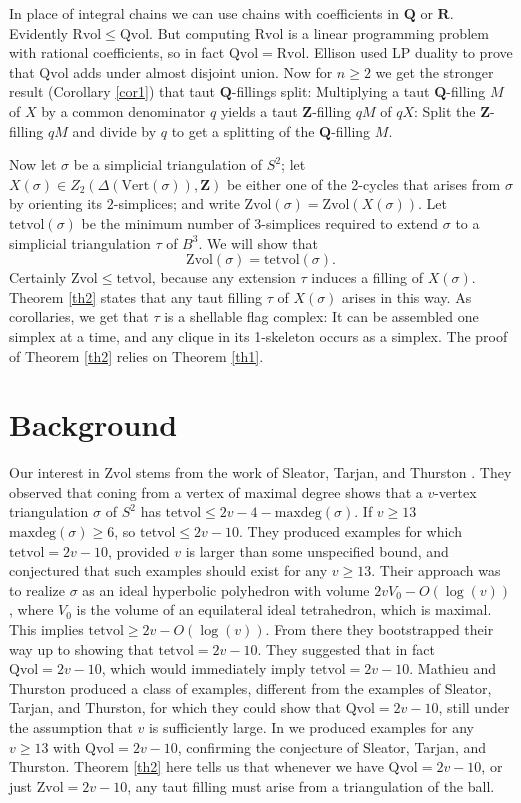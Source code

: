 \documentclass[12pt]{article}
\def\ZZ{\mathbf{Z}}
\def\QQ{\mathbf{Q}}
\def\RR{\mathbf{R}}
\newcommand{\kw}{\mathrm}
\newcommand{\maxdeg}{\kw{maxdeg}}
\newcommand{\vertices}{\kw{Vert}}
\newcommand{\Zvol}{\kw{Zvol}}
\newcommand{\Qvol}{\kw{Qvol}}
\newcommand{\Rvol}{\kw{Rvol}}
\newcommand{\tetvol}{\kw{tetvol}}
\begin{document}
In place of integral chains we can use chains with
coefficients in $\QQ$ or $\RR$.
Evidently $\Rvol \leq \Qvol$.
But computing $\Rvol$ is
a linear programming problem with rational coefficients,
so in fact $\Qvol = \Rvol$.
Ellison used LP duality to prove that
$\Qvol$ adds under almost
disjoint union.
Now for $n \geq 2$ we get the stronger result
(Corollary \ref{cor1})
that taut $\QQ$-fillings split:
Multiplying a taut
$\QQ$-filling $M$ of $X$ by a common denominator $q$
yields a taut $\ZZ$-filling $qM$ of $qX$:
Split the $\ZZ$-filling $qM$ and divide by $q$ to get a splitting
of the $\QQ$-filling $M$.

Now let $\sigma$ be a simplicial triangulation of $S^2$;
let $X(\sigma) \in Z_2(\Delta(\vertices(\sigma)),\ZZ)$
be either one of the 2-cycles
that arises from $\sigma$ by orienting its $2$-simplices;
and write $\Zvol(\sigma) = \Zvol(X(\sigma))$.
Let $\tetvol(\sigma)$ be the minimum number of $3$-simplices
required to extend $\sigma$ to a simplicial triangulation $\tau$ of $B^3$.
We will show that
\[
\Zvol(\sigma) = \tetvol(\sigma)
.
\]
Certainly $\Zvol \leq \tetvol$,
because any extension $\tau$ induces a filling
of $X(\sigma)$.
Theorem \ref{th2} states that 
any taut filling $\tau$ of $X(\sigma)$ arises in this way.
As corollaries,
we get that $\tau$ is a shellable flag complex:
It can be assembled one simplex at a time,
and any clique in its 1-skeleton occurs as a simplex.
The proof of Theorem \ref{th2} relies on Theorem \ref{th1}.

\section{Background}

Our interest in $\Zvol$ stems from the work
of Sleator, Tarjan, and Thurston
\cite{stt:jams}.
They observed that coning from a vertex of maximal degree
shows that a $v$-vertex
triangulation $\sigma$
of $S^2$ has $\tetvol \leq 2v-4-\maxdeg(\sigma)$.
If $v\geq13$ $\maxdeg(\sigma) \geq 6$, so $\tetvol \leq 2v-10$.
They
produced examples for which $\tetvol = 2v-10$, provided
$v$ is larger than some unspecified bound,
and conjectured that such examples should exist for any $v \geq 13$.
Their approach was to 
realize $\sigma$ as an ideal hyperbolic polyhedron
with volume $2v V_0-O(\log(v))$,
where $V_0$ is the volume of an
equilateral ideal tetrahedron,
which is maximal.
This implies $\tetvol \geq 2v-O(\log(v))$.
From there they bootstrapped their way up to showing
that $\tetvol=2v-10$.
They suggested
\cite[p. 697]{stt:jams}
that in fact $\Qvol= 2v-10$,
which would immediately imply $\tetvol=2v-10$.
Mathieu and Thurston \cite{mt}
produced a class of examples,
different from the examples of Sleator, Tarjan, and Thurston,
for which they could show that $\Qvol = 2v-10$,
still under the assumption that $v$
is sufficiently large.
In \cite{dew:filling} we produced examples for any $v \geq 13$ with
$\Qvol=2v-10$, confirming the conjecture of Sleator, Tarjan, and Thurston.
Theorem \ref{th2} here
tells us that whenever we have $\Qvol=2v-10$,
or just $\Zvol=2v-10$, any taut filling
must arise from a triangulation of the ball.
\end{document}
